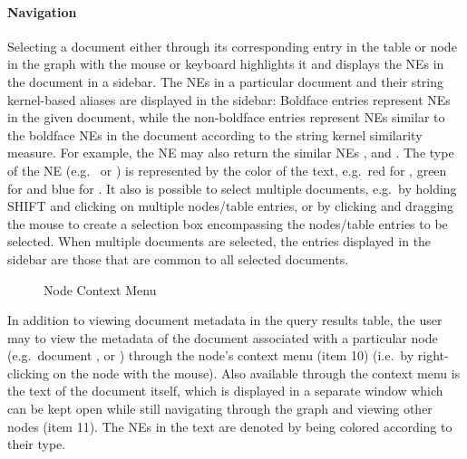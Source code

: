 \paragraph{Navigation}
Selecting a document either through its corresponding entry in the table or node in the graph with
the mouse or keyboard highlights it and displays the NEs in the document in a sidebar. The NEs in a
particular document and their string kernel-based aliases are displayed in the sidebar: Boldface
entries represent NEs in the given document, while the non-boldface entries represent NEs similar to
the boldface NEs in the document according to the string kernel similarity measure. For example, the
NE \textbf{} may also return the similar NEs ,  and . The type of the NE (e.g.\  or )
is represented by the color of the text, e.g.\ red for , green for
 and blue for . It also is possible to select multiple
documents, e.g.\ by holding SHIFT and clicking on multiple nodes/table entries, or by clicking and
dragging the mouse to create a selection box encompassing the nodes/table entries to be selected.
When multiple documents are selected, the entries displayed in the sidebar are those that are common
to all selected documents.
\begin{figure}[ht]
\centering
\caption{Node Context Menu}
\end{figure}

In addition to viewing document metadata in the query results table, the user may to view the
metadata of the document associated with a particular node (e.g.\ document , 
or ) through the node's context menu (item 10) (i.e.\ by right-clicking on the node
with the mouse). Also available through the context menu is the text of the document itself, which
is displayed in a separate window which can be kept open while still navigating through the graph
and viewing other nodes (item 11). The NEs in the text are denoted by being colored according to
their type.
